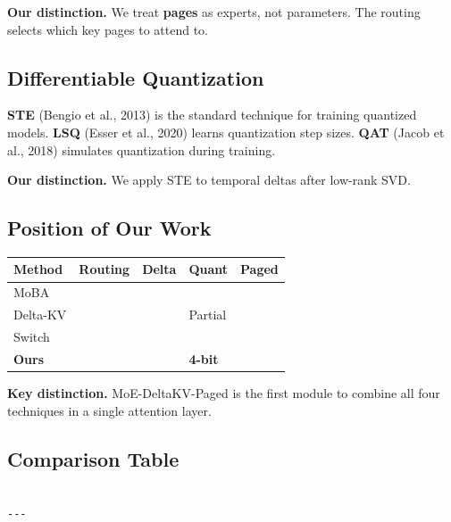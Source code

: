 \textbf{Our distinction.} We treat \textbf{pages} as experts, not parameters. The 
routing selects which key pages to attend to.

\subsection{Differentiable Quantization}

\textbf{STE} (Bengio et al., 2013) is the standard technique for training 
quantized models. \textbf{LSQ} (Esser et al., 2020) learns quantization step 
sizes. \textbf{QAT} (Jacob et al., 2018) simulates quantization during training.

\textbf{Our distinction.} We apply STE to temporal deltas after low-rank SVD.

\subsection{Position of Our Work}

\begin{table}[H]
\centering
\small
\begin{tabular}{lllll}
\toprule
\textbf{Method} & \textbf{Routing} & \textbf{Delta} & \textbf{Quant} & \textbf{Paged} \\
\midrule
MoBA &  &  &  &  \\
Delta-KV &  &  & Partial &  \\
Switch &  &  &  &  \\
\textbf{Ours} & \textbf{ } & \textbf{ } & \textbf{4-bit} & \textbf{ } \\
\bottomrule
\end{tabular}
\end{table}

\textbf{Key distinction.} MoE-DeltaKV-Paged is the first module to combine all 
four techniques in a single attention layer.



\subsection{Comparison Table}

\begin{lstlisting}

---
\end{lstlisting}